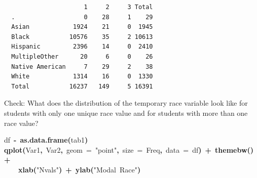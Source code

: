\documentclass[12pt]{article}
\makeatletter
\newcommand{\hlfunctioncall}[1]{\textcolor[rgb]{0.501960784313725,0,0.329411764705882}{\textbf{#1}}}%
\newcommand{\hlstring}[1]{\textcolor[rgb]{0.6,0.6,1}{#1}}%
\newcommand{\hlkeyword}[1]{\textcolor[rgb]{0,0,0}{\textbf{#1}}}%
\newcommand{\hlargument}[1]{\textcolor[rgb]{0.690196078431373,0.250980392156863,0.0196078431372549}{#1}}%
\newcommand{\hlassignement}[1]{\textcolor[rgb]{0,0,0}{\textbf{#1}}}%
\newcommand{\hlsymbol}[1]{\textcolor[rgb]{0,0,0}{#1}}%
\newcommand{\hlstd}[1]{\textcolor[rgb]{0,0,0}{#1}}%
\newenvironment{kframe}{%
 \def\FrameCommand##1{\hskip\@totalleftmargin \hskip-\fboxsep
 \colorbox{shadecolor}{##1}\hskip-\fboxsep
     \hskip-\linewidth \hskip-\@totalleftmargin \hskip\columnwidth}%
 \MakeFramed {\advance\hsize-\width
   \@totalleftmargin\z@ \linewidth\hsize
   \@setminipage}}%
 {\par\unskip\endMakeFramed}
\newenvironment{knitrout}{}{} %
\makeatother
\begin{document}
\begin{knitrout}
\begin{kframe}
\begin{verbatim}
                      1     2     3 Total
  .                   0    28     1    29
  Asian            1924    21     0  1945
  Black           10576    35     2 10613
  Hispanic         2396    14     0  2410
  MultipleOther      20     6     0    26
  Native American     7    29     2    38
  White            1314    16     0  1330
  Total           16237   149     5 16391
\end{verbatim}
\end{kframe}
\end{knitrout}


Check:  What does the distribution of the temporary race variable look like for students with only one unique race value and for 
students with more than one race value?

\begin{knitrout}
\color{fgcolor}\begin{kframe}
\begin{flushleft}
\ttfamily\noindent
\hlsymbol{df}{\ }\hlassignement{\usebox{\hlnormalsizeboxlessthan}-}{\ }\hlfunctioncall{as.data.frame}\hlkeyword{(}\hlsymbol{tab1}\hlkeyword{)}\hspace*{\fill}\\
\hlstd{}\hlfunctioncall{qplot}\hlkeyword{(}\hlsymbol{Var1}\hlkeyword{,}{\ }\hlsymbol{Var2}\hlkeyword{,}{\ }\hlargument{geom}{\ }\hlargument{=}{\ }\hlstring{"{}point"{}}\hlkeyword{,}{\ }\hlargument{size}{\ }\hlargument{=}{\ }\hlsymbol{Freq}\hlkeyword{,}{\ }\hlargument{data}{\ }\hlargument{=}{\ }\hlsymbol{df}\hlkeyword{)}{\ }\hlkeyword{+}{\ }\hlfunctioncall{theme\usebox{\hlnormalsizeboxunderscore}bw}\hlkeyword{(}\hlkeyword{)}{\ }\hlkeyword{+}\hspace*{\fill}\\
\hlstd{}{\ }{\ }{\ }{\ }\hlfunctioncall{xlab}\hlkeyword{(}\hlstring{"{}Nvals"{}}\hlkeyword{)}{\ }\hlkeyword{+}{\ }\hlfunctioncall{ylab}\hlkeyword{(}\hlstring{"{}Modal{\ }Race"{}}\hlkeyword{)}\mbox{}
\normalfont
\end{flushleft}
\end{kframe}\begin{figure}[]



\end{figure}
\end{knitrout}
\end{document}
